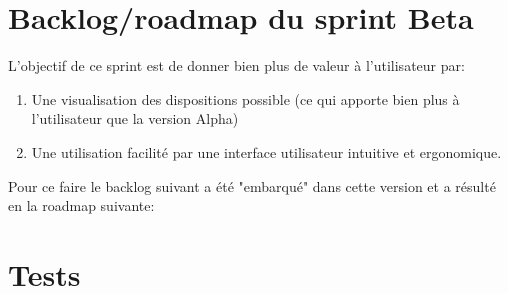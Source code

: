\section{Backlog/roadmap du sprint Beta}

L’objectif de ce sprint est de donner bien plus de valeur à l'utilisateur par:
\begin{enumerate}
    \item Une visualisation des dispositions possible (ce qui apporte bien plus à l'utilisateur que la version Alpha)
    \item Une utilisation facilité par une interface utilisateur intuitive et ergonomique.
\end{enumerate}

Pour ce faire le backlog suivant a été "embarqué" dans cette version et a résulté en la roadmap suivante:


\section{Tests}


